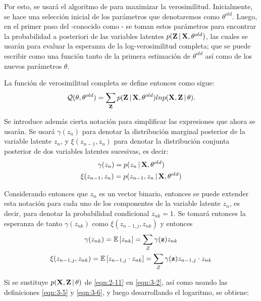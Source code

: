 Por esto, se usará el algoritmo de \aem para maximizar la verosimilitud. Inicialmente, se hace una selección inicial de los parámetros que denotaremos como $\theta^{old}$. Luego, en el primer paso del \aem -conocido como \estep- se toman estos parámetros para encontrar la probabilidad a posteriori de las variables latentes $p(\textbf{Z} \,|\, \textbf{X}, \theta^{old})$, las cuales se usarán para evaluar la esperanza de la log-verosimilitud completa; que se puede escribir como una función tanto de la primera estimación de $\theta^{old}$ así como de los nuevos parámetros $\theta$.

La función de verosimilitud completa se define entonces como sigue:
\begin{equation}
\mathcal{Q}(\theta, \theta^{old}) = 
  \sum_{\textbf{Z}} p(\textbf{Z} \,|\, \textbf{X}, \theta^{old})
  ln p(\textbf{X}, \textbf{Z} \,|\, \theta).
\label{eqn:3-2}
\end{equation}

Se introduce además cierta notación para simplificar las expresiones que ahora se usarán. Se usará $\gamma(z_n)$ para denotar la distribución marginal posterior de la variable latente $z_n$, y $\xi(z_{n-1}, z_n)$ para denotar la distribución conjunta posterior de dos variables latentes sucesivas, es decir: 
\begin{gather}
\gamma(z_n) = p(z_n \,|\, \textbf{X}, \theta^{old}) \label{eqn:3-3} \\
\xi(z_{n-1}, z_n) = p(z_{n-1}, z_n \,|\, \textbf{X}, \theta^{old}) \label{eqn:3-4}
\end{gather}

Considerando entonces que $z_n$ es un vector binario, entonces se puede extender esta notación para cada uno de los componentes de la variable latente $z_n$, es decir, para denotar la probabilidad condicional $z_{nk} = 1$. Se
tomará entonces la esperanza de tanto $\gamma(z_{nk})$ como $\xi(z_{n-1, j}, z_{nk})$ y entonces
\begin{gather}
\gamma(z_{nk}) = \mathbb{E} \left[ z_{nk} \right] = \sum_Z  \gamma(\textbf{z}) z_{nk} \label{eqn:3-5} \\
\xi(z_{n-1,j}, z_{nk}) = \mathbb{E} \left[z_{n-1, j} \cdot z_{nk} \right] = \sum_Z  \gamma(\textbf{z}) z_{n-1, j} 
\cdot z_{nk}
\label{eqn:3-6}
\end{gather}

Si se sustituye $p(\textbf{X}, \textbf{Z} \,|\, \theta)$ de \eqref{eqn:2-11} en \eqref{eqn:3-2}, así como usando las definiciones \eqref{eqn:3-5} y \eqref{eqn:3-6}, y luego desarrollando el logaritmo, se obtiene: 

